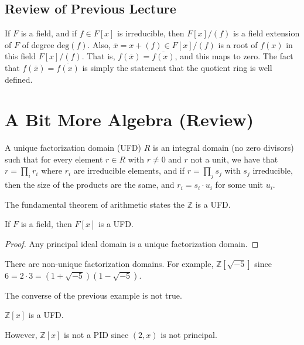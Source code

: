 \documentclass{article}                                                        %
\begin{document}
        \subsection{Review of Previous Lecture}
            If $F$ is a field, and if $f\in{F}[x]$ is irreducible, then
            $F[x]/(f)$ is a field extension of $F$ of degree $\textrm{deg}(f)$.
            Also, $\overline{x}=x+(f)\in{F}[x]/(f)$ is a root of $f(x)$ in this
            field $F[x]/(f)$. That is, $f(\overline{x})=\overline{f(x)}$, and
            this maps to zero. The fact that $f(\overline{x})=\overline{f(x)}$
            is simply the statement that the quotient ring is well defined.
    \section{A Bit More Algebra (Review)}
        \begin{definition}
            A unique factorization domain (UFD) $R$ is an integral domain
            (no zero divisors) such that for every element $r\in{R}$ with
            $r\ne{0}$ and $r$ not a unit, we have that $r=\prod_{i}r_{i}$ where
            $r_{i}$ are irreducible elements, and if $r=\prod_{j}s_{j}$ with
            $s_{j}$ irreducible, then the size of the products are the same, and
            $r_{i}=s_{i}\cdot{u}_{i}$ for some unit $u_{i}$.
        \end{definition}
        \begin{example}
            The fundamental theorem of arithmetic states the $\mathbb{Z}$ is a
            UFD.
        \end{example}
        \begin{theorem}
            If $F$ is a field, then $F[x]$ is a UFD.
        \end{theorem}
        \begin{proof}
            Any principal ideal domain is a unique factorization domain.
        \end{proof}
        \begin{example}
            There are non-unique factorization domains. For example,
            $\mathbb{Z}[\sqrt{\minus{5}}]$ since
            $6=2\cdot{3}=(1+\sqrt{\minus{5}})(1-\sqrt{\minus{5}})$.
        \end{example}
        The converse of the previous example is not true.
        \begin{theorem}
            $\mathbb{Z}[x]$ is a UFD.
        \end{theorem}
        However, $\mathbb{Z}[x]$ is not a PID since $(2,x)$ is not principal.
\end{document}
